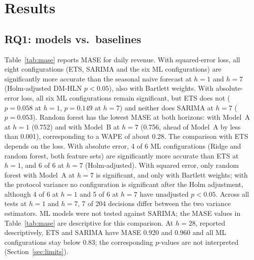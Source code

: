\documentclass[conference]{IEEEtran}
\begin{document}
\section{Results}
\subsection{RQ1: models vs.\ baselines}
Table~\ref{tab:mase} reports MASE for daily revenue. With squared-error loss, all eight configurations (ETS,
SARIMA and the six ML configurations) are significantly more accurate than the seasonal naive forecast at %
$h=1$ and $h=7$ (Holm-adjusted DM-HLN $p<0.05$), also with Bartlett weights. %
With absolute-error loss, all six ML configurations remain significant, but ETS does not ($p=0.058$ at $h=1$, %
$p=0.149$ at $h=7$) and neither does SARIMA at $h=7$ ($p=0.053$). %
Random forest has the lowest MASE at both horizons: with Model~A at $h=1$ (0.752) and with Model~B at $h=7$ %
(0.756, ahead of Model~A by less than 0.001), %
corresponding to a WAPE of about 0.28. %
The comparison with ETS depends on the loss. With absolute error, 4 of 6 ML configurations (Ridge and random
forest, both feature sets) are significantly more accurate than ETS at $h=1$, and 6 of 6 at $h=7$
(Holm-adjusted).
With squared error, only random forest with Model~A at $h=7$ is significant, and only with Bartlett weights;
with the protocol variance no configuration is significant after the Holm adjustment, although 4 of 6 at
$h=1$ and 5 of 6 at $h=7$ have unadjusted $p<0.05$.
Across all tests at $h=1$ and $h=7$, 7 of 204 decisions differ between the two variance estimators. %
ML models were not tested against SARIMA; the MASE values in Table~\ref{tab:mase} are descriptive for this
comparison. At $h=28$, reported descriptively, ETS and SARIMA have MASE 0.920 and 0.960 and all ML %
configurations stay below 0.83; the corresponding $p$-values are not interpreted (Section~\ref{sec:limits}).
\end{document}
